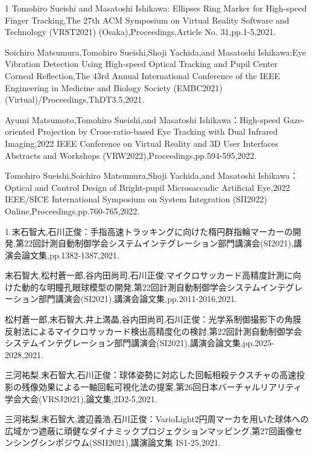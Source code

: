 \begin{査読付}{1}
Tomohiro Sueishi and Masatoshi Ishikawa:  Ellipses Ring Marker for High-speed Finger Tracking,The 27th ACM Symposium on Virtual Reality Software and Technology (VRST2021) (Osaka),Proceedings,Article No. 31,pp.1-5,2021.


Soichiro Matsumura,Tomohiro Sueishi,Shoji Yachida,and Masatoshi Ishikawa:Eye Vibration Detection Using High-speed Optical Tracking and Pupil Center Corneal Reflection,The 43rd Annual International Conference of the IEEE Engineering in Medicine and Biology Society (EMBC2021) (Virtual)/Proceedings,ThDT3.5,2021.

Ayumi Matsumoto,Tomohiro Sueishi,and Masatoshi Ishikawa：High-speed Gaze-oriented Projection by Cross-ratio-based Eye Tracking with Dual Infrared Imaging,2022 IEEE Conference on Virtual Reality and 3D User Interfaces Abstracts and Workshops (VRW2022),Proceedings,pp.594-595,2022.

Tomohiro Sueishi,Soichiro Matsumura,Shoji Yachida,and Masatoshi Ishikawa： Optical and Control Design of Bright-pupil Microsaccadic Artificial Eye,2022 IEEE/SICE International Symposium on System Integration (SII2022) Online,Proceedings,pp.760-765,2022.

\end{査読付}

\begin{発表}{1}
末石智大,石川正俊：手指高速トラッキングに向けた楕円群指輪マーカーの開発,第22回計測自動制御学会システムインテグレーション部門講演会(SI2021),講演会論文集,pp.1382-1387,2021.

末石智大,松村蒼一郎,谷内田尚司,石川正俊:マイクロサッカード高精度計測に向けた動的な明瞳孔眼球模型の開発,第22回計測自動制御学会システムインテグレーション部門講演会(SI2021),講演会論文集,pp.2011-2016,2021.

松村蒼一郎,末石智大,井上満晶,谷内田尚司,石川正俊：光学系制御撮影下の角膜反射法によるマイクロサッカード検出高精度化の検討,第22回計測自動制御学会システムインテグレーション部門講演会(SI2021),講演会論文集,pp.2025-2028,2021.

三河祐梨,末石智大,石川正俊：球体姿勢に対応した回転相殺テクスチャの高速投影の残像効果による一軸回転可視化法の提案,第26回日本バーチャルリアリティ学会大会(VRSJ2021),論文集,2D2-5,2021.

三河祐梨,末石智大,渡辺義浩,石川正俊：VarioLight2円周マーカを用いた球体への広域かつ遮蔽に頑健なダイナミックプロジェクションマッピング,第27回画像センシングシンポジウム(SSII2021),講演論文集 IS1-25,2021.

\end{発表}
